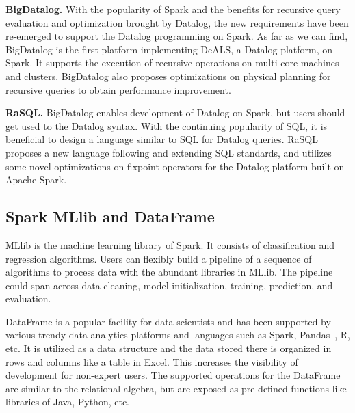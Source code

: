 \textbf{BigDatalog.}
With the popularity of Spark and the benefits for recursive query evaluation and optimization brought by Datalog, the new requirements have been re-emerged to support the Datalog programming on Spark. 
As far as we can find, BigDatalog \citep{shkapsky2016big} is the first platform implementing DeALS, a Datalog platform, on Spark. It supports the execution of recursive operations on  multi-core machines and clusters. BigDatalog also proposes optimizations on physical planning for recursive queries to obtain performance improvement. 

\textbf{RaSQL.} 
BigDatalog enables development of Datalog on Spark, but users should get used to the Datalog syntax. With the continuing popularity of SQL, it is beneficial to design a language similar to SQL for Datalog queries. RaSQL \citep{gu2019rasql} proposes a new language following and extending SQL standards, and utilizes some novel optimizations on fixpoint operators for the Datalog platform built on Apache Spark.  



\subsection{Spark MLlib and DataFrame}

MLlib is the machine learning library of Spark. It consists of classification and regression algorithms. Users can flexibly build a pipeline of a sequence of algorithms to process data with the abundant libraries in MLlib. The pipeline could span across data cleaning, model initialization, training, prediction, and evaluation.  

DataFrame is a popular facility for data scientists and has been supported by various trendy data analytics platforms and languages such as Spark, Pandas~\citep{pythonDataframe}, R, etc. It is utilized as a data structure and the data stored there is organized in rows and columns like a table in Excel. This increases the visibility of development for non-expert users. The supported operations for the DataFrame are similar to the relational algebra, but are exposed as pre-defined functions like libraries of Java, Python, etc.  


